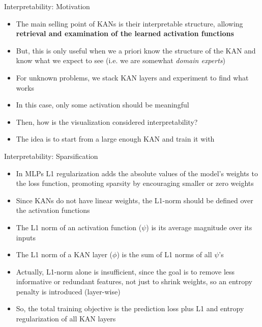 \begin{frame}{Interpretability: Motivation}
    \begin{itemize}
        \item The main selling point of KANs is their interpretable structure, allowing \textbf{retrieval and examination of the learned activation functions} \vspace{0.5em}
        \item But, this is only useful when we a priori know the structure of the KAN and know what we expect to see (i.e. we are somewhat \textit{domain experts})\vspace{0.5em}
        \item For unknown problems, we stack KAN layers and experiment to find what works \vspace{0.5em}
        \item In this case, only some activation should be meaningful \vspace{0.5em}
        \item Then, how is the visualization considered interpretability? \vspace{0.5em}
        \item The idea is to start from a large enough KAN and train it with 
    \end{itemize}
\end{frame}

\begin{frame}{Interpretability: Sparsification}
    \begin{itemize}
        \item In MLPs L1 regularization adds the absolute values of the model's weights to the loss function, promoting sparsity by encouraging smaller or zero weights \vspace{0.5em}
        \item Since KANs do not have linear weights, the L1-norm should be defined over the activation functions \vspace{0.5em}
        \item The L1 norm of an activation function ($\psi$) is its average magnitude over its inputs \vspace{0.5em}
        \item The L1 norm of a KAN layer ($\phi$) is the sum of L1 norms of all $\psi$'s \vspace{0.5em}
        \item Actually, L1-norm alone is insufficient, since the goal is to remove less informative or redundant features, not just to shrink weights, so an entropy penalty is introduced (layer-wise)\vspace{0.5em}
        \item So, the total training objective is the prediction loss plus L1 and entropy regularization of all KAN layers \vspace{0.5em}
    \end{itemize}
\end{frame}

